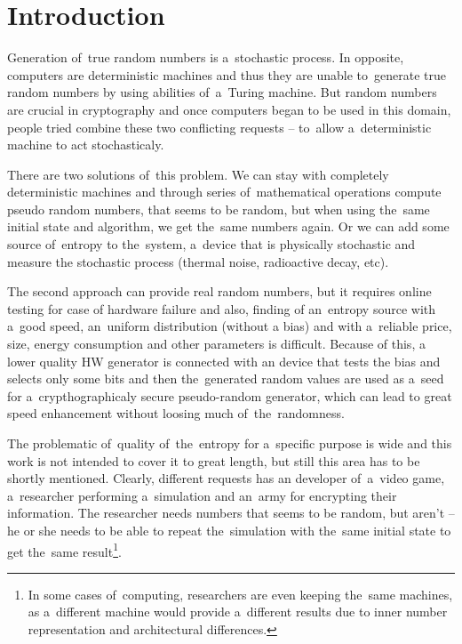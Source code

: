 \chapter{Introduction}
\par{ %
Generation of~true random numbers is a~stochastic process.
In opposite, computers are deterministic machines 
and thus they are unable to~generate true random numbers by using abilities 
of~a~Turing machine. 
But random numbers are crucial in cryptography and once computers began 
to be used in this domain, people tried combine these two conflicting requests 
-- to~allow a~deterministic machine to act stochasticaly. 
}

\par{
There are two solutions of~this problem. We can stay with completely 
deterministic machines and through series of~mathematical operations 
compute pseudo random numbers, that seems to be random, 
but when using the~same initial state and algorithm, we get the~same 
numbers again. Or we can add some source of~entropy to the~system, 
a~device that is physically stochastic and measure the stochastic process 
(thermal noise, radioactive decay, etc).
}

\par{
The second approach can provide real random numbers, but it requires online 
testing for case of hardware failure and also, finding of an~entropy source with
a~good speed, an~uniform distribution (without a bias) and with a~reliable price,
size, energy consumption and other parameters is difficult. Because of this, 
a lower quality HW generator is connected with an device that tests the bias 
and selects only some bits and then the~generated random values are used 
as a~seed for a~crypthographicaly secure pseudo-random generator, 
which can lead to great speed enhancement without loosing much 
of~the~randomness.
}

\par{
The problematic of~quality of~the~entropy for a~specific purpose is wide 
and this work is not intended to cover it to great length, but still this area 
has to be shortly mentioned. Clearly, different requests has an developer 
of~a~video game, a~researcher performing a~simulation and an~army 
for encrypting their information. 
The researcher needs numbers that seems to be random, but aren't 
-- he or she needs to be able to repeat the~simulation with the~same initial state 
to get the~same result\footnote{In some cases of~computing, 
researchers are even keeping the~same machines, as a~different machine 
would provide a~different results due to inner number representation and architectural differences.\cite{ArithmeticInCloud}}.
}

